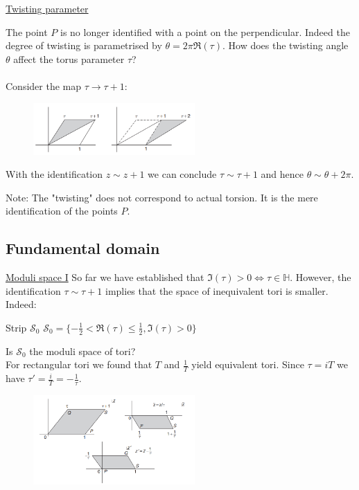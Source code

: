 \documentclass[11pt,aspectratio=169]{beamer}
\begin{document}
\begin{frame}{\underline{Twisting parameter}}

	
	The point $P$ is no longer identified with a point on the perpendicular. Indeed the degree of twisting is parametrised by $\theta = 2\pi \Re(\tau)$.
	How does the twisting angle $\theta$ affect the torus parameter $\tau$?
	\\~\\
	Consider the map $\tau \rightarrow \tau + 1$:
	\begin{figure}[htbp]
		\centering
		\includegraphics[width = 0.55\textwidth]{elements/tau map.PNG}
	\end{figure}
	With the identification $z \sim z + 1$ we can conclude $\tau \sim \tau + 1$ and hence $\theta \sim \theta + 2\pi$.
	\begin{block}{Note:}
		The "twisting" does not correspond to actual torsion. It is the mere identification of the points $P$.
	\end{block}
\end{frame}

\subsection{Fundamental domain}
\begin{frame}{\underline{Moduli space I}}
	So far we have established that $\Im(\tau) > 0 \Leftrightarrow \tau \in \mathbb{H}$.
	However, the identification $\tau \sim \tau + 1$ implies that the space of inequivalent tori is smaller. Indeed:
	\begin{block}{Strip $\mathcal{S}_{0}$}
		$\mathcal{S}_{0} = \{-\frac{1}{2} < \Re(\tau) \leq \frac{1}{2}, \Im(\tau) > 0\}$
	\end{block}
	Is $\mathcal{S}_{0}$ the moduli space of tori?
	\\
	For rectangular tori we found that $T$ and $\frac{1}{T}$ yield equivalent tori. Since $\tau = iT$ we have $\tau' = \frac{i}{T} = -\frac{1}{\tau}$.
	\begin{figure}[htbp]
		\centering
		\includegraphics[width = 0.55\textwidth]{elements/s module trans.PNG}
	\end{figure}
\end{frame}
\end{document}
